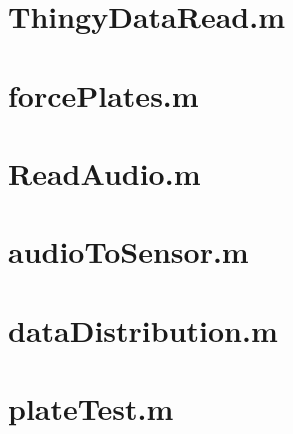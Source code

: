 \section{ThingyDataRead.m}\label{cd:ThingyDataRead}


\section{forcePlates.m}\label{cd:forcePlates}


\section{ReadAudio.m}\label{cd:ReadAudio}


\section{audioToSensor.m}\label{cd:audioToSensor}


\section{dataDistribution.m}\label{cd:dataDistribution}


\section{plateTest.m}\label{cd:plateTest}
